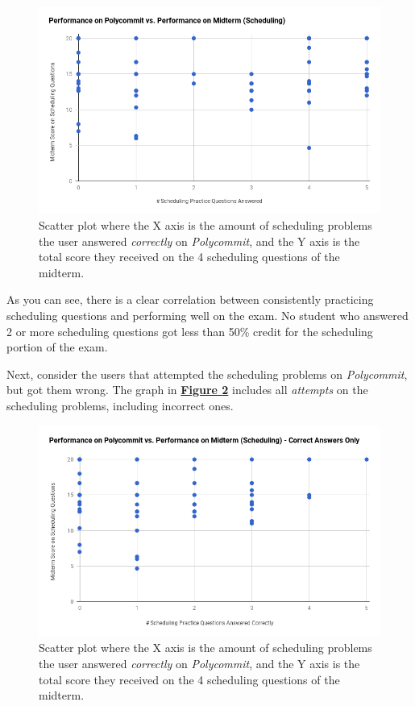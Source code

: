 \begin{figure}[h!b]
	\includegraphics[width=1.0\linewidth]{figures/scheduling-right}
	\caption{Scatter plot where the X axis is the amount of scheduling problems the user answered \textit{correctly} on \textit{Polycommit}, and the Y axis is the total score they received on the 4 scheduling questions of the midterm.}
	\label{fig:scheduling}
\end{figure}

\par As you can see, there is a clear correlation between consistently practicing scheduling questions and performing well on the exam. No student who answered 2 or more scheduling questions got less than 50\% credit for the scheduling portion of the exam.

\par Next, consider the users that attempted the scheduling problems on \textit{Polycommit}, but got them wrong. The graph in \textbf{\hyperref[fig:scheduling-wrong]{Figure \ref*{fig:scheduling-wrong}}} includes all \textit{attempts} on the scheduling problems, including incorrect ones.

\begin{figure}[h!]
	\includegraphics[width=1.0\linewidth]{figures/scheduling-wrong}
	\caption{Scatter plot where the X axis is the amount of scheduling problems the user answered \textit{correctly} on \textit{Polycommit}, and the Y axis is the total score they received on the 4 scheduling questions of the midterm.}
	\label{fig:scheduling-wrong}
\end{figure}



